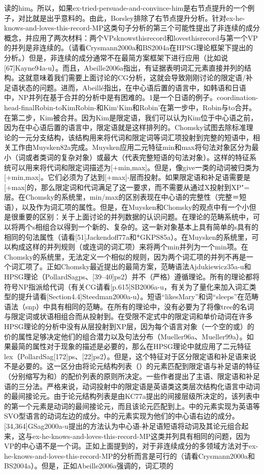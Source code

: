 读的him。所以，如果ex-tried-persuade-and-convince-him是右节点提升的一个例子，对比就是出乎意料的。由此，Borsley排除了右节点提升分析。针对ex-he-knows-and-loves-this-record-MP这类句子分析的第三个可能性提出了非连续的成分概念，并应用了两次材料：两个VPsknowsthisrecord和lovesthisrecord与第一个VP的并列是非连续的。（请看Crysmann2000a和BS2004a在HPSG理论框架下提出的分析。）但是，非连续的成分通常不在最简方案框架下进行应用（比如说[67]Kayne94a-u）。而且，Abeille2006a指出，有证据表明词汇元素直接并列的结构。这就意味着我们需要上面讨论的CG分析，这就会导致刚刚讨论的限定语/补足语状态的问题。进而，Abeillé指出，在中心语后置的语言中，如韩语和日语中，NP并列在基于合并的分析中是有困难的。1是一个日语的例子。coordination-head-finalRobin-toKimRobin-和Kim`Kim和Robin'在第一步中，Robin与to合并。在第二步，Kim被合并。因为Kim是限定语，我们可以认为Kim位于中心语之前，因为在中心语后置的语言中，限定语就是这样排列的。Chomsky试图去除标准理论的一元分支结构，该结构用来将代词和限定词等词汇项投射到完整的短语中，相关工作由Muysken82a完成。Muysken应用二元特征min和max将句法对象区分为最小（词或者类词的复杂对象）或最大（代表完整短语的句法对象）。这样的特征系统可以用来将代词和限定词描述为[+min,max]。但是，像give一类的动词被归类为[+min,max]。它们必须为了达到[+max]-层而投射。如果限定语和补足语需要是[+max]的，那么限定词和代词满足了这一要求，而不需要从通过X投射到XP"=层。在Chomsky的系统里，min/max的区别表现在中心语的完整性（完整＝短语），以及作为词汇项的属性。但是，在Muysken和Chomsky的观点中有一个小但是很重要的区别：关于上面讨论的并列数据的认识问题。在理论的范畴系统中，可以将两个s相组合以得到一个新的、复杂的。这一新对象基本上具有简单的s具有的相同的句法属性（请看[51]Jackendoff77a和*GKPS85a）。在Muysken的系统里，可以构成这样的并列规则（或连词的词汇项）来将两个min并列为一个min项。在Chomsky的系统里，无法定义一个相似的规则，因为两个词汇项的并列不再是一个词汇项了。正如Chomsky最近提出的最简方案，范畴语法Ajdukiewicz35a-u和HPSG理论（PollardSagps、[39--40]ps2）并不（严格）遵循理论。所有的理论都将符号NP指派给代词（有关CG请看[p.615]SB2006a-u，有关为了量化来加入词汇类型的提升请看[Section4.4]Steedman2000a-u）。短语“likesMary”和词“sleeps”在范畴语法（snp）中具有相同的范畴。在所有的理论中，没有必要为了将像tree的名词与限定词或状语相组合而从投射到。在受限不定式中的限定词和单价动词在许多HPSG理论的分析中没有从层投射到XP层，因为每个语言对象（一个空的或）的价的属性足够决定他们的组合潜力以及句法分布（Mueller96a、Mueller99a）。如果最简的属性对于现象的描述是必要的，那么在HPSG理论中就应用了二元特征lex（PollardSag[172]ps、[22]ps2）。但是，这个特征对于区分限定语和补足语来说不是必要的。这一区分由将论元结构列表（）的元素匹配到限定语与补足语的特征（分别缩写为和）的配价列表的原则所决定。一些作者提出了主语、限定语和补足语的三分法。严格来说，动词投射中的限定语是英语类这类层次结构化语言中动词的最间接论元。由于论元结构列表是由KC77a提出的间接层级所决定的，该列表中的第一个元素是动词的最间接论元，而且该论元匹配到上。中的元素实现为英语等SVO型语言的动词左边的成分。中的元素实现为他们的中心语右边的成分。[34,364]GSag2000a-u提出的方法认为中心语-补足语短语将动词及其论元组合起来，这与ex-he-knows-and-loves-this-record-MP这类并列具有相同的问题，因为VP的中心语不是一个词。正如上面提到的，对于非连续成分的多领域方法对于ex-he-knows-and-loves-this-record-MP的分析而言是可行的（请看Crysmann2000a和BS2004a）。但是，正如Abeille2006a强调的，词汇项的